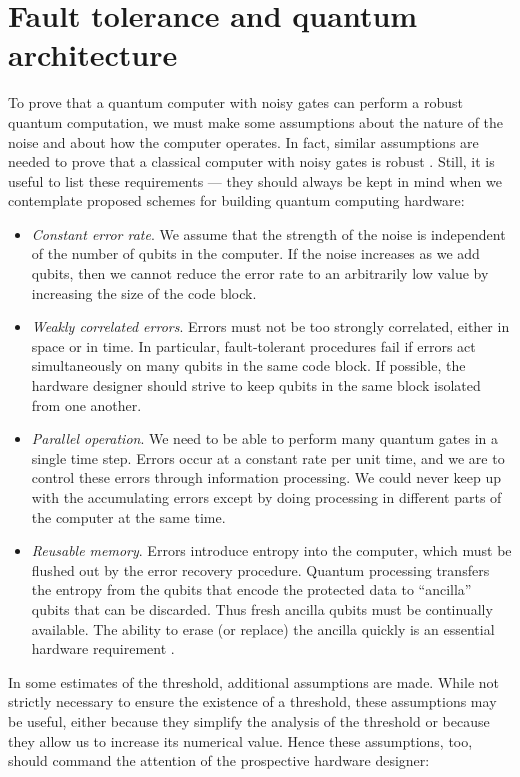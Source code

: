 \section{Fault tolerance and quantum architecture}
\label{sec:ft}

To prove that a quantum computer with noisy gates can perform a robust quantum computation, we must make some assumptions about the nature of the noise and about how the computer operates. In fact, similar assumptions are needed to prove that a classical computer with noisy gates is robust \cite{gacs}. Still, it is useful to list these requirements --- they should always be kept in mind when we contemplate proposed schemes for building quantum computing hardware:

\begin{itemize}
\item {\em Constant error rate}. We assume that the strength of the noise is independent of the number of qubits in the computer. If the noise increases as we add qubits, then we cannot reduce the error rate to an arbitrarily low value by increasing the size of the code block. 
\item {\em Weakly correlated errors}. Errors must not be too strongly correlated, either in space or in time. In particular, fault-tolerant procedures fail if errors act simultaneously on many qubits in the same code block. If possible, the hardware designer should strive to keep qubits in the same block isolated from one another.
\item {\em Parallel operation}. We need to be able to perform many quantum gates in a single time step. Errors occur at a constant rate per unit time, and we are to control these errors through information processing. We could never keep up with the accumulating errors except by doing processing in different parts of the computer at the same time.
\item {\em Reusable memory}. Errors introduce entropy into the computer, which must be flushed out by the error recovery procedure. Quantum processing transfers the entropy from the qubits that encode the protected data to ``ancilla'' qubits that can be discarded. Thus fresh ancilla qubits must be continually available. The ability to erase (or replace) the ancilla quickly is an essential hardware requirement \cite{nisan}.
\end{itemize}

In some estimates of the threshold, additional assumptions are made. While not strictly necessary to ensure the existence of a threshold, these assumptions may be useful, either because they simplify the analysis of the threshold or because they allow us to increase its numerical value. Hence these assumptions, too, should command the attention of the prospective hardware designer:


